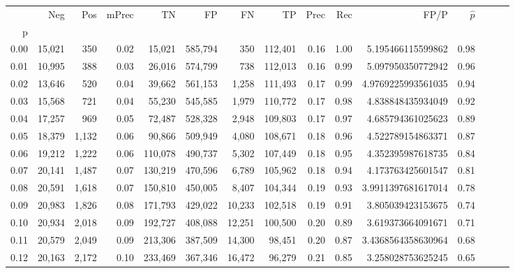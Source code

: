 \begin{tabular}{rrrrrrrrrrrrrrr}
\toprule
{} &     Neg &    Pos & mPrec &       TN &       FP &       FN &       TP &  Prec &   Rec &                  FP/P & $\hat{p}$ \\
p    &         &        &       &          &          &          &          &       &       &                       &           \\
\midrule
0.00 &  15,021 &    350 &  0.02 &   15,021 &  585,794 &      350 &  112,401 &  0.16 &  1.00 &     5.195466115599862 &      0.98 \\
0.01 &  10,995 &    388 &  0.03 &   26,016 &  574,799 &      738 &  112,013 &  0.16 &  0.99 &     5.097950350772942 &      0.96 \\
0.02 &  13,646 &    520 &  0.04 &   39,662 &  561,153 &    1,258 &  111,493 &  0.17 &  0.99 &    4.9769225993561035 &      0.94 \\
0.03 &  15,568 &    721 &  0.04 &   55,230 &  545,585 &    1,979 &  110,772 &  0.17 &  0.98 &     4.838848435934049 &      0.92 \\
0.04 &  17,257 &    969 &  0.05 &   72,487 &  528,328 &    2,948 &  109,803 &  0.17 &  0.97 &     4.685794361025623 &      0.89 \\
0.05 &  18,379 &  1,132 &  0.06 &   90,866 &  509,949 &    4,080 &  108,671 &  0.18 &  0.96 &     4.522789154863371 &      0.87 \\
0.06 &  19,212 &  1,222 &  0.06 &  110,078 &  490,737 &    5,302 &  107,449 &  0.18 &  0.95 &     4.352395987618735 &      0.84 \\
0.07 &  20,141 &  1,487 &  0.07 &  130,219 &  470,596 &    6,789 &  105,962 &  0.18 &  0.94 &     4.173763425601547 &      0.81 \\
0.08 &  20,591 &  1,618 &  0.07 &  150,810 &  450,005 &    8,407 &  104,344 &  0.19 &  0.93 &    3.9911397681617014 &      0.78 \\
0.09 &  20,983 &  1,826 &  0.08 &  171,793 &  429,022 &   10,233 &  102,518 &  0.19 &  0.91 &     3.805039423153675 &      0.74 \\
0.10 &  20,934 &  2,018 &  0.09 &  192,727 &  408,088 &   12,251 &  100,500 &  0.20 &  0.89 &     3.619373664091671 &      0.71 \\
0.11 &  20,579 &  2,049 &  0.09 &  213,306 &  387,509 &   14,300 &   98,451 &  0.20 &  0.87 &    3.4368564358630964 &      0.68 \\
0.12 &  20,163 &  2,172 &  0.10 &  233,469 &  367,346 &   16,472 &   96,279 &  0.21 &  0.85 &     3.258028753625245 &      0.65 \\

\end{tabular}
